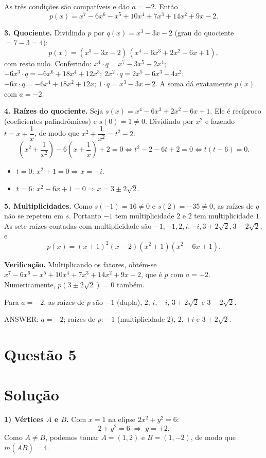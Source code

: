 \documentclass{article}%
\begin{document}
As três condições são compatíveis e dão $a=-2$. Então
\[
p(x)=x^7-6x^6-x^5+10x^4+7x^3+14x^2+9x-2 .
\]

\textbf{3. Quociente.} Dividindo $p$ por $q(x)=x^3-3x-2$ (grau do quociente $=7-3=4$):
\[
p(x)=(x^3-3x-2)\,(x^4-6x^3+2x^2-6x+1),
\]
com resto nulo. Conferindo: $x^4\cdot q=x^7-3x^5-2x^4$; $-6x^3\cdot q=-6x^6+18x^4+12x^3$; $2x^2\cdot q=2x^5-6x^3-4x^2$; $-6x\cdot q=-6x^4+18x^2+12x$; $1\cdot q=x^3-3x-2$. A soma dá exatamente $p(x)$ com $a=-2$.

\textbf{4. Raízes do quociente.} Seja $s(x)=x^4-6x^3+2x^2-6x+1$. Ele é recíproco (coeficientes palindrômicos) e $s(0)=1\neq0$. Dividindo por $x^2$ e fazendo $t=x+\dfrac1x$, de modo que $x^2+\dfrac1{x^2}=t^2-2$:
\[
\left(x^2+\frac1{x^2}\right)-6\left(x+\frac1x\right)+2=0
\iff t^2-2-6t+2=0\iff t(t-6)=0 .
\]
\begin{itemize}
\item $t=0$: $x^2+1=0\Rightarrow x=\pm i$.
\item $t=6$: $x^2-6x+1=0\Rightarrow x=3\pm2\sqrt2$.
\end{itemize}

\textbf{5. Multiplicidades.} Como $s(-1)=16\neq0$ e $s(2)=-35\neq0$, as raízes de $q$ não se repetem em $s$. Portanto $-1$ tem multiplicidade $2$ e $2$ tem multiplicidade $1$. As sete raízes contadas com multiplicidade são $-1,-1,2,i,-i,3+2\sqrt2,3-2\sqrt2$, e
\[
p(x)=(x+1)^2(x-2)(x^2+1)(x^2-6x+1).
\]

\textbf{Verificação.} Multiplicando os fatores, obtém-se $x^7-6x^6-x^5+10x^4+7x^3+14x^2+9x-2$, que é $p$ com $a=-2$. Numericamente, $p(3\pm2\sqrt2)=0$ também.

\medskip
Para $a=-2$, as raízes de $p$ são $-1$ (dupla), $2$, $i$, $-i$, $3+2\sqrt2$ e $3-2\sqrt2$.

ANSWER: $a=-2$; raízes de $p$: $-1$ (multiplicidade 2), $2$, $\pm i$ e $3\pm2\sqrt2$.%
\newpage%
\section*{Questão 5}

\section*{Solução}

\textbf{1) Vértices $A$ e $B$.} Com $x=1$ na elipse $2x^2+y^2=6$:
\[
2+y^2=6 \;\Rightarrow\; y=\pm 2 .
\]
Como $A\neq B$, podemos tomar $A=(1,2)$ e $B=(1,-2)$, de modo que $m(\overline{AB})=4$.
\end{document}
